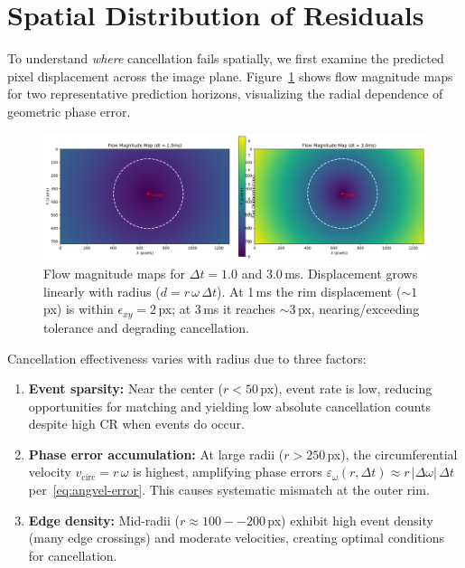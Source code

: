 
%   

\section{Spatial Distribution of Residuals}

To understand \emph{where} cancellation fails spatially, we first examine the predicted pixel displacement across the image plane. Figure~\ref{fig:flow_magnitude} shows flow magnitude maps for two representative prediction horizons, visualizing the radial dependence of geometric phase error.

\begin{figure}[t]
  \centering
  \includegraphics[width=0.95\linewidth]{images/results_figures/flow_magnitude_maps.png}
\caption{Flow magnitude maps for $\Delta t=1.0$ and $3.0$\,ms. Displacement grows linearly with radius ($d=r\,\omega\,\Delta t$). At 1\,ms the rim displacement ($\sim 1$\,px) is within $\epsilon_{xy}=2$\,px; at 3\,ms it reaches $\sim 3$\,px, nearing/exceeding tolerance and degrading cancellation.}
  \label{fig:flow_magnitude}
\end{figure}

Cancellation effectiveness varies with radius due to three factors:
\begin{enumerate}
\item \textbf{Event sparsity:} Near the center ($r < 50$\,px), event rate is low, reducing opportunities for matching and yielding low absolute cancellation counts despite high CR when events do occur.
\item \textbf{Phase error accumulation:} At large radii ($r > 250$\,px), the circumferential velocity $v_{\text{circ}} = r\,\omega$ is highest, amplifying phase errors $\varepsilon_{\omega}(r,\Delta t) \approx r\,|\Delta\omega|\,\Delta t$ per~\eqref{eq:angvel-error}. This causes systematic mismatch at the outer rim.
\item \textbf{Edge density:} Mid-radii ($r \approx 100--200$\,px) exhibit high event density (many edge crossings) and moderate velocities, creating optimal conditions for cancellation.
\end{enumerate}


